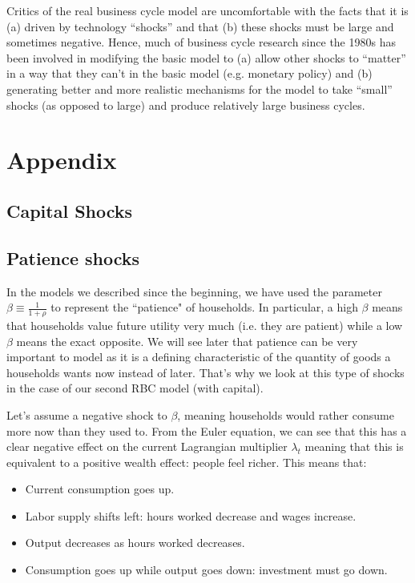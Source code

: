 \documentclass[12pt]{report}
\begin{document}
Critics of the real business cycle model are uncomfortable with the facts that it is (a)
driven by technology “shocks” and that (b) these shocks must be large and sometimes negative.
Hence, much of business cycle research since the 1980s has been involved in modifying the basic
model  to  (a)  allow  other  shocks  to  “matter”  in  a  way  that  they  can’t  in  the  basic  model (e.g. monetary policy) and (b) generating better and more realistic mechanisms for the model to take “small” shocks (as opposed to large) and produce relatively large business cycles.

\section{Appendix}

\subsection{Capital Shocks}

\subsection{Patience shocks}

In the models we described since the beginning, we have used the parameter $\beta\equiv\frac{1}{1+\rho}$ to represent the “patience" of households. In particular, a high $\beta$ means that households value future utility very much (i.e. they are patient) while a low $\beta$ means the exact opposite. We will see later that patience can be very important to model as it is a defining characteristic of the quantity of goods a households wants now instead of later. That's why we look at this type of shocks in the case of our second RBC model (with capital).

Let's assume a negative shock to $\beta$, meaning households would rather consume more now than they used to. From the Euler equation, we can see that this has a clear negative effect on the current Lagrangian multiplier $\lambda_t$ meaning that this is equivalent to a positive wealth effect: people feel richer. This means that:\begin{itemize}
\item Current consumption goes up.
\item Labor supply shifts left: hours worked decrease and wages increase.
\item Output decreases as hours worked decreases.
\item Consumption goes up while output goes down: investment must go down.
\end{itemize}
\end{document}
